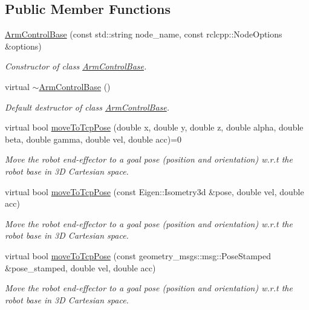 \subsection*{Public Member Functions}
\begin{DoxyCompactItemize}
\item 
\hyperlink{classArmControlBase_a5e5d5e6aaf2cf2957266353630f528fa}{Arm\+Control\+Base} (const std\+::string node\+\_\+name, const rclcpp\+::\+Node\+Options \&options)
\begin{DoxyCompactList}\small\item\em Constructor of class \hyperlink{classArmControlBase}{Arm\+Control\+Base}. \end{DoxyCompactList}\item 
\mbox{\label{classArmControlBase_aa9bd5efabe0650f102dd42ee88adc820}} 
virtual \hyperlink{classArmControlBase_aa9bd5efabe0650f102dd42ee88adc820}{$\sim$\+Arm\+Control\+Base} ()
\begin{DoxyCompactList}\small\item\em Default destructor of class \hyperlink{classArmControlBase}{Arm\+Control\+Base}. \end{DoxyCompactList}\item 
virtual bool \hyperlink{classArmControlBase_aafd6f3d4bb78472087f53bfab89f9cb1}{move\+To\+Tcp\+Pose} (double x, double y, double z, double alpha, double beta, double gamma, double vel, double acc)=0
\begin{DoxyCompactList}\small\item\em Move the robot end-\/effector to a goal pose (position and orientation) w.\+r.\+t the robot base in 3D Cartesian space. \end{DoxyCompactList}\item 
virtual bool \hyperlink{classArmControlBase_a54c69305477aac08b8389d11920ccf5d}{move\+To\+Tcp\+Pose} (const Eigen\+::\+Isometry3d \&pose, double vel, double acc)
\begin{DoxyCompactList}\small\item\em Move the robot end-\/effector to a goal pose (position and orientation) w.\+r.\+t the robot base in 3D Cartesian space. \end{DoxyCompactList}\item 
virtual bool \hyperlink{classArmControlBase_a66a2e439066819b120405b2c0cbeaac5}{move\+To\+Tcp\+Pose} (const geometry\+\_\+msgs\+::msg\+::\+Pose\+Stamped \&pose\+\_\+stamped, double vel, double acc)
\begin{DoxyCompactList}\small\item\em Move the robot end-\/effector to a goal pose (position and orientation) w.\+r.\+t the robot base in 3D Cartesian space. \end{DoxyCompactList}\item 

\end{DoxyCompactItemize}
